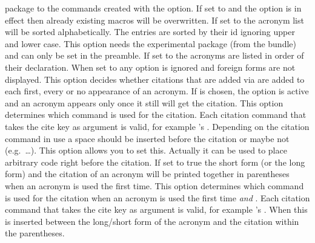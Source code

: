 \documentclass[load-preamble+]{cnltx-doc}
\begin{document}
\begin{options}
     package to the commands created with the 
    option.
    If set to  and the option  is in effect
    then already existing macros will be overwritten.
    If set to  the acronym list will be sorted alphabetically.  The
    entries are sorted by their \acs{id} ignoring upper and lower case.  This
    option needs the experimental package  (from the
     bundle) and can only be set in the preamble.
    If set to  the acronyms are listed in order of their
    declaration.
    When set to  any  option is ignored and
    foreign forms are not displayed.
    This option decides whether citations that are added
    via  are added to each first, every or no appearance of an
    acronym.  If  is chosen, the option  is
    active and an acronym appears only once it still will get the citation.
    This option determines which command is used for the citation.  Each
    citation command that takes the cite key as argument is valid, for example
    's .
    Depending on the citation command in use a space should be inserted before
    the citation or maybe not (e.g.\ \ldots).  This option
    allows you to set this.  Actually it can be used to place arbitrary code
    right before the citation.
    If set to true the short form (or the long form) and the
    citation of an acronym will be printed together in parentheses when an
    acronym is used the first time.
    This option determines which command is used for the
    citation when an acronym is used the first time \emph{and}
    .  Each citation command that takes the cite
    key as argument is valid, for example 's .
    When  this is inserted
    between the long/short form of the acronym and the citation within the
    parentheses.

\end{options}
\end{document}
